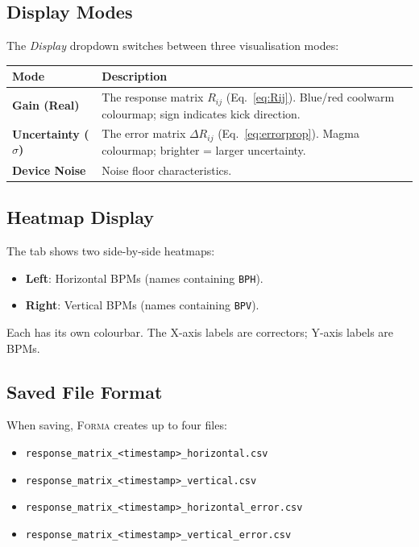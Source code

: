 \documentclass[11pt,a4paper,twoside]{report}
\newcommand{\forma}{\textsc{Forma}}
\newcommand{\field}[1]{\textit{#1}}
\begin{document}
\subsection{Display Modes}

The \field{Display} dropdown switches between three visualisation modes:

\begin{tabularx}{\textwidth}{lX}
  \toprule
  \textbf{Mode} & \textbf{Description} \\
  \midrule
  \textbf{Gain (Real)}            & The response matrix $R_{ij}$ (Eq.~\ref{eq:Rij}). Blue/red coolwarm colourmap; sign indicates kick direction. \\
  \textbf{Uncertainty ($\sigma$)} & The error matrix $\Delta R_{ij}$ (Eq.~\ref{eq:errorprop}). Magma colourmap; brighter = larger uncertainty. \\
  \textbf{Device Noise}           & Noise floor characteristics. \\
  \bottomrule
\end{tabularx}

\subsection{Heatmap Display}

The tab shows two side-by-side heatmaps:
\begin{itemize}
  \item \textbf{Left}: Horizontal BPMs (names containing \texttt{BPH}).
  \item \textbf{Right}: Vertical BPMs (names containing \texttt{BPV}).
\end{itemize}
Each has its own colourbar. The X-axis labels are correctors; Y-axis labels are BPMs.

\subsection{Saved File Format}

When saving, \forma{} creates up to four files:
\begin{itemize}
  \item \texttt{response\_matrix\_<timestamp>\_horizontal.csv}
  \item \texttt{response\_matrix\_<timestamp>\_vertical.csv}
  \item \texttt{response\_matrix\_<timestamp>\_horizontal\_error.csv}
  \item \texttt{response\_matrix\_<timestamp>\_vertical\_error.csv}
\end{itemize}
\end{document}
